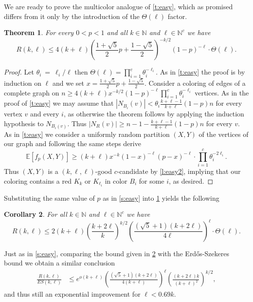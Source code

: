 \documentclass[reqno,final,12pt]{amsart}
\newtheorem{thm}{Theorem}
\newtheorem{cor}[thm]{Corollary}
\newcommand{\bb}[1]{\mathbb{#1}}
\newcommand{\bl}[1]{\boldsymbol{#1}}
\newcommand{\fs}[2]{\left(\frac{#1}{#2}\right)}
\newcommand{\s}[1]{\left(#1\right)}
\begin{document}
We are ready to prove the multicolor analogue of \cref{t:easy}, which as promised differs from it only by the introduction of the $\Theta(\bl{\ell})$ factor.

\begin{thm}\label{t:easy2}
	For every $0< p <1$ and all $k \in \bb{N}$ and  $\bl{\ell} \in \bb{N}^c$ we have $$R(k,\bl{\ell}) \leq 4(k+\ell)\s{\frac{1+\sqrt{5}}{2}p+\frac{1-\sqrt{5}}{2}}^{-k/2}(1-p)^{-\ell} \cdot \Theta(\bl{\ell}).$$
\end{thm}
\begin{proof} Let $\theta_i~=~\ell_i/\ell$ then $\Theta(\bl{\ell}) = \prod_{i=1}^c \theta_i^{-\ell_i}$. As in \cref{t:easy} the proof is by induction on $\ell$ and we set 
$x = \frac{1+\sqrt{5}}{2}p+\frac{1-\sqrt{5}}{2}$.
Consider a  coloring of edges of a complete graph on $n \geq 4(k+\ell)x^{-k/2}(1-p)^{-\ell}  \prod_{i=1}^c \theta_i^{-\ell_i}$ vertices.  As in the proof of \cref{t:easy}  we may assume that $|N_{B_i}(v)|< \theta_i\frac{k+\ell-1}{k+\ell}(1-p)n$ for every vertex $v$ and every $i$, as otherwise the theorem follows by applying the induction hypothesis to $N_{B_i(v)}$. Thus $|N_R(v)| \geq n-1 - \frac{k+\ell-1}{k+\ell}(1-p)n$ for every $v$. As in \cref{t:easy}  we consider a uniformly random partition $(X,Y)$ of the vertices of our graph and following the same steps derive
	$$\bb{E}[f_p(X,Y)] \geq (k+\ell)x^{-k}(1-x)^{-\ell}(p-x)^{-\ell}\cdot \prod_{i=1}^c\theta_i^{-2\ell_i} .
	$$ Thus $(X,Y)$ is a $(k,\bl{\ell},\bl{\ell})$-good $c$-candidate by \cref{l:easy2}, implying that  our  coloring contains a red $K_k$ or $K_{\ell_i}$ in color $B_i$ for some $i$, as desired.
\end{proof}	

Substituting the same value of $p$ as in \cref{s:easy} into \cref{t:easy2}   yields the following
\begin{cor}\label{c:easy2}
	For all $k \in \bb{N}$ and  $\bl{\ell} \in \bb{N}^c$ we have $$R(k,\bl{\ell}) \leq 2(k+\ell)\s{\frac{k+2 \ell}{k}}^{k/2}\fs{\left(\sqrt{5}+1\right) (k+2 \ell)}{4\ell}^{\ell}\cdot \Theta(\bl{\ell}).$$
\end{cor}

Just as   in \cref{s:easy}, comparing the bound given in \cref{c:easy2} with the Erd\H{o}s-Szekeres bound we obtain a similar  conclusion
\begin{align*} \frac{R(k,\bl{\ell})}{ES(k,\bl{\ell})} &\leq e^{o(k+\ell)} \fs{(\sqrt{5}+1)(k+2\ell)}{4(k+\ell)}^{\ell}\fs{(k+2\ell)k}{(k+\ell)^2}^{k/2}, 
\end{align*}
and thus still an exponential improvement for $\ell < 0.69 k$. 
\end{document}
